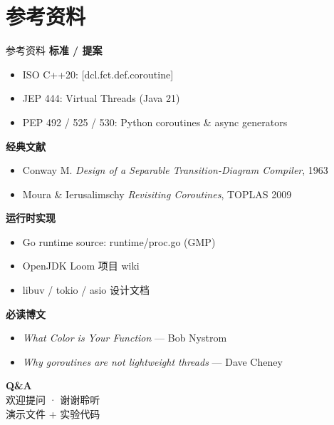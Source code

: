 \documentclass[aspectratio=169, 10pt]{beamer}
\begin{document}
\section{参考资料}

\begin{frame}{参考资料}
  \small
  \textbf{标准 / 提案}
  \begin{itemize}
    \item ISO C++20: {[}dcl.fct.def.coroutine{]}
    \item JEP 444: Virtual Threads (Java 21)
    \item PEP 492 / 525 / 530: Python coroutines \& async generators
  \end{itemize}

  \textbf{经典文献}
  \begin{itemize}
    \item Conway M. \textit{Design of a Separable Transition-Diagram Compiler}, 1963
    \item Moura \& Ierusalimschy \textit{Revisiting Coroutines}, TOPLAS 2009
  \end{itemize}

  \textbf{运行时实现}
  \begin{itemize}
    \item Go runtime source: runtime/proc.go (GMP)
    \item OpenJDK Loom 项目 wiki
    \item libuv / tokio / asio 设计文档
  \end{itemize}

  \textbf{必读博文}
  \begin{itemize}
    \item \textit{What Color is Your Function} — Bob Nystrom
    \item \textit{Why goroutines are not lightweight threads} — Dave Cheney
  \end{itemize}
\end{frame}

\begin{frame}
  \begin{center}
    \vspace{2cm}
    {\Huge\textbf{Q\&A}}\\[1cm]
    {\Large 欢迎提问 · 谢谢聆听}\\[1cm]
    {\normalsize 演示文件 + 实验代码}
  \end{center}
\end{frame}
\end{document}
